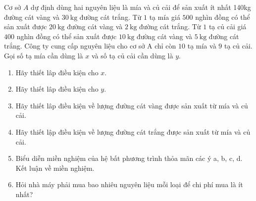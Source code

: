 \begin{bt}%
Cơ sở $A$ dự định dùng hai nguyên liệu là mía và củ cải để sản xuất ít nhất 140kg đường cát vàng và $30 \mathrm{~kg}$ đường cát trắng. Từ $1$ tạ mía giá $500$ nghìn đồng có thể sản xuất được $20 \mathrm{~kg}$ đường cát vàng và $2 \mathrm{~kg}$ đường cát trắng. Từ $1$ tạ củ cải giá $400$ nghìn đồng có thể sản xuất được $10 \mathrm{~kg}$ đường cát vàng và $5 \mathrm{~kg}$ đường cát trắng. Công ty cung cấp nguyên liệu cho cơ sở $\mathrm{A}$ chỉ còn $10$ tạ mía và $9$ tạ củ cải. Gọi số tạ mía cần dùng là $x$ và số tạ củ cải cần dùng là $y$.
\begin{enumerate}
\item  Hãy thiết lâp điều kiện cho $x$.
\item Hãy thiết lâp điều kiện cho $y$.
\item Hãy thiết lâp điều kiện về lượng đường cát vàng được sản xuất từ mía và củ cải.
\item Hãy thiết lập điều kiện về lượng đường cát trắng được sản xuất từ mía và củ cải.
\item Biểu diễn miền nghiệm của hệ bất phương trình thỏa mãn các ý a, b, c, d. Kết luận về miền nghiệm.
\item Hỏi nhà máy phải mua bao nhiêu nguyên liệu mỗi loại để chi phí mua là ít nhất?
\end{enumerate}
\end{bt}

